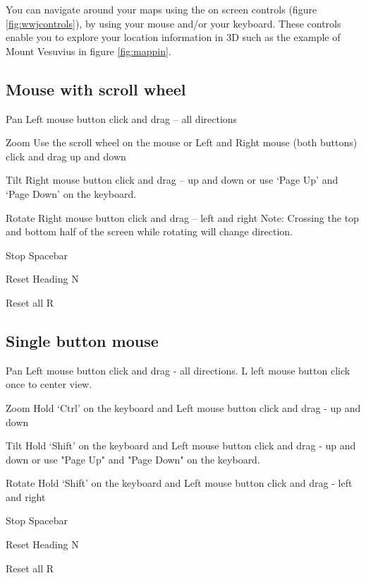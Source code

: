 You can navigate around your maps using the on screen controls (figure \ref{fig:wwjcontrols}), by using your mouse and/or your keyboard.  These controls enable you to explore your location information in 3D such as the example of Mount Vesuvius in figure \ref{fig:mappin}.




\subsection{Mouse with scroll wheel}

\begin{description*}
      \item[Pan] Left mouse button click and drag -- all directions
      \item[Zoom] Use the scroll wheel on the mouse or Left and Right mouse (both buttons) click and drag up and down
      \item[Tilt] Right mouse button click and drag -- up and down or use `Page Up' and `Page Down' on the keyboard.
      \item[Rotate] Right mouse button click and drag -- left and right Note: Crossing the top and bottom half of the screen while rotating will change direction.
      \item[Stop] Spacebar
      \item[Reset Heading] N
      \item[Reset all] R 
\end{description*}



\subsection{Single button mouse}
\begin{description*}
     \item[Pan] Left mouse button click and drag - all directions. L left mouse button click once to center view.
     \item[Zoom] Hold `Ctrl' on the keyboard and Left mouse button click and drag - up and down
     \item[Tilt] Hold `Shift' on the keyboard and Left mouse button click and drag - up and down or use "Page Up" and "Page Down" on the keyboard.
     \item[Rotate] Hold `Shift' on the keyboard and Left mouse button click and drag - left and right
     \item[Stop] Spacebar
     \item[Reset Heading] N
     \item[Reset all] R 
\end{description*}

